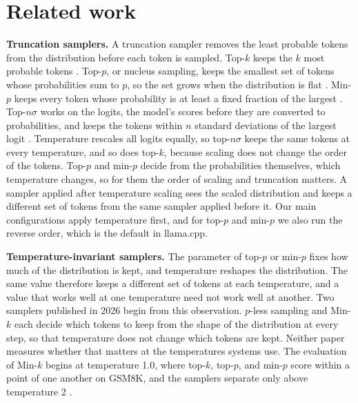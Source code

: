 \documentclass[11pt]{article}
\begin{document}
\section{Related work}
\label{sec:background}

\textbf{Truncation samplers.} A truncation sampler removes the least probable tokens from the
distribution before each token is sampled. Top-$k$ keeps the $k$ most probable tokens
\citep{fan2018hierarchical}. Top-$p$, or nucleus sampling, keeps the smallest set of tokens
whose probabilities sum to $p$, so the set grows when the distribution is flat
\citep{holtzman2020curious}. Min-$p$ keeps every token whose probability is at least a fixed
fraction of the largest \citep{nguyen2024minp}. Top-$n\sigma$ works on the logits, the model's
scores before they are converted to probabilities, and keeps the tokens within $n$ standard
deviations of the largest logit \citep{tang2024topn}. Temperature rescales all logits equally,
so top-$n\sigma$ keeps the same tokens at every temperature, and so does top-$k$, because
scaling does not change the order of the tokens. Top-$p$ and min-$p$ decide from the
probabilities themselves, which temperature changes, so for them the order of scaling and
truncation matters. A sampler applied after temperature scaling sees the scaled distribution
and keeps a different set of tokens from the same sampler applied before it. Our main
configurations apply temperature first, and for top-$p$ and min-$p$ we also run the reverse
order, which is the default in llama.cpp.

\textbf{Temperature-invariant samplers.} The parameter of top-$p$ or min-$p$ fixes how much of
the distribution is kept, and temperature reshapes the distribution. The same value therefore
keeps a different set of tokens at each temperature, and a value that works well at one
temperature need not work well at another. Two samplers published in 2026 begin from this
observation. $p$-less sampling \citep{tan2026pless} and Min-$k$ \citep{ding2026mink} each
decide which tokens to keep from the shape of the distribution at every step, so that
temperature does not change which tokens are kept. Neither paper measures whether that matters
at the temperatures systems use. The evaluation of Min-$k$ begins at temperature 1.0, where
top-$k$, top-$p$, and min-$p$ score within a point of one another on GSM8K, and the samplers
separate only above temperature 2 \citep{ding2026mink}.
\end{document}
